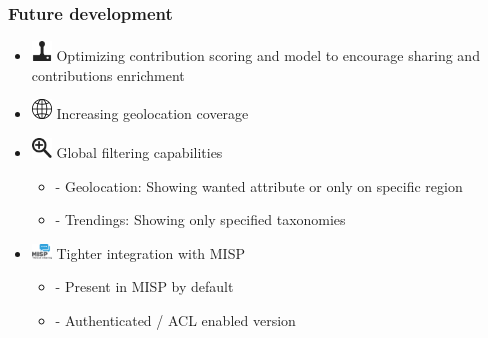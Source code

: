 \begin{frame}
    \frametitle{Future development}
    \begin{itemize}
        \item[] \includegraphics[width=20px]{images/icons/joystick.png} \; Optimizing contribution scoring and model to encourage sharing and contributions enrichment
        \item[] \includegraphics[width=20px]{images/icons/globe.png} \; Increasing geolocation coverage
        \item[] \includegraphics[width=20px]{images/icons/zoom.png} \; Global filtering capabilities
            \begin{itemize}
                \item[] \quad - Geolocation: Showing wanted attribute or only on specific region
                \item[] \quad - Trendings: Showing only specified taxonomies
            \end{itemize}
        \item[] \includegraphics[width=20px]{images/icons/MISP.png} \; Tighter integration with MISP
            \begin{itemize}
                \item[] \quad - Present in MISP by default
                \item[] \quad - Authenticated / ACL enabled version
            \end{itemize}
    \end{itemize}
\end{frame}



